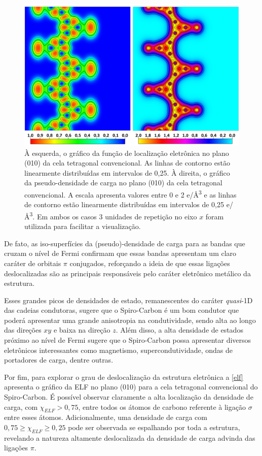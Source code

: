 	\begin{figure}[!ht]
		\centering
		\includegraphics[width=1\linewidth]{capitulos/fig/ELF}
		\caption{À esquerda, o gráfico da função de localização eletrônica no plano (010) da cela tetragonal convencional. As linhas de contorno estão linearmente distribuídas em intervalos de 0,25. À direita, o gráfico da pseudo-densidade de carga no plano (010) da cela tetragonal convencional. A escala apresenta valores entre 0 e 2 e/\AA{}\textsuperscript{3} e as linhas de contorno estão linearmente distribuídas em intervalos de 0,25 e/\AA{}\textsuperscript{3}. Em ambos os casos 3 unidades de repetição no eixo $x$ foram utilizada para facilitar a visualização.}
		\label{elf}
	\end{figure}

	De fato, as iso-superfícies da (pseudo)-densidade de carga para as bandas que cruzam o nível de Fermi confirmam que essas bandas apresentam um claro caráter de orbitais $\pi$ conjugados, reforçando a ideia de que essas ligações deslocalizadas são as principais responsáveis pelo caráter eletrônico metálico da estrutura.  
	
	Esses grandes picos de densidades de estado, remanescentes do caráter \textit{quasi}-1D das cadeias condutoras, sugere que o Spiro-Carbon é um bom condutor que poderá apresentar uma grande anisotropia na condutividade, sendo alta ao longo das direções $xy$ e baixa na direção $z$. Além disso, a alta densidade de estados próximo ao nível de Fermi sugere que o Spiro-Carbon possa apresentar diversos eletrônicos interessantes como magnetismo, supercondutividade, ondas de portadores de carga, dentre outras.

	Por fim, para explorar o grau de deslocalização da estrutura eletrônica a \autoref{elf} apresenta o gráfico da ELF no plano (010) para a cela tetragonal convencional do Spiro-Carbon. É possível observar claramente a alta localização da densidade de carga, com  $\chi_{ELF}>0,75$, entre todos os átomos de carbono referente à ligação $\sigma$ entre esses átomos. Adicionalmente, uma densidade de carga com $0,75\geq \chi_{ELF}\geq 0,25$ pode ser observada se espalhando por toda a estrutura, revelando a natureza altamente deslocalizada da densidade de carga advinda das ligações $\pi$. 
	
